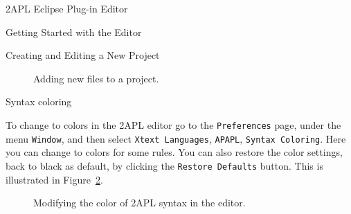 \begin{chapter}{2APL Eclipse Plug-in Editor}
\begin{section}{Getting Started with the Editor}
\begin{subsection}{Creating and Editing a New Project}
\begin{enumerate}
            \begin{figure}[h]
                \begin{minipage}{0.6\linewidth}
                    \begin{center}
                    \end{center}
                \end{minipage}
                \hspace{.5cm}
                \begin{minipage}{0.3\linewidth}
                    \begin{center}
                    \end{center}
                \end{minipage}
                \caption{Adding new files to a project.}\label{fig:newfile1}
            \end{figure}

\end{enumerate}
\end{subsection}

\end{section}


\begin{section}{Syntax coloring}

To change to colors in the 2APL editor go to the
\texttt{Preferences} page, under the menu \texttt{Window}, and then
select \texttt{Xtext Languages}, \texttt{APAPL}, \texttt{Syntax
Coloring}. Here you can change to colors for some rules. You can
also restore the color settings, back to black as default, by
clicking the \texttt{Restore Defaults} button. This is illustrated
in Figure~\ref{fig:coloring}.

        \begin{figure}[ht]
            \begin{center}
            \end{center}\label{fig:color1}
            \caption{Modifying the color of 2APL syntax in the editor.}\label{fig:coloring}
        \end{figure}

\end{section}



\end{chapter}
